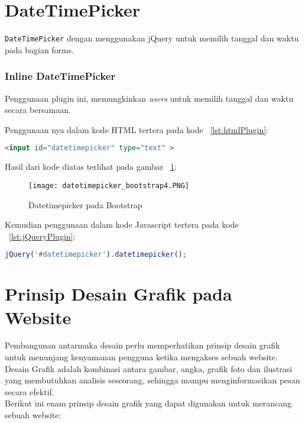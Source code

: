 \section{DateTimePicker}
\texttt{DateTimePicker} dengan menggunakan jQuery untuk memilih tanggal dan waktu pada bagian forms. \cite{datetimepicker}
\subsubsection{Inline DateTimePicker}
Penggunaan plugin ini, memungkinkan \textit{users} untuk memilih tanggal dan waktu secara bersamaan.

Penggunaan nya dalam kode HTML tertera pada kode ~\ref{lst:htmlPlugin}:
\begin{lstlisting}[style=customhtml, language=HTML,  basicstyle=\ttfamily, frame=single, columns=fullflexible, keepspaces=true, breaklines=true, showstringspaces=false, label={lst:htmlPlugin}, caption=Kode HTML pada plugin.] 
<input id="datetimepicker" type="text" >
\end{lstlisting}

\noindent Hasil dari kode diatas terlihat pada gambar ~\ref{fig:datetimepickerBootstrap}:
\begin{figure} [H]
	\centering  
	\texttt{[image: datetimepicker\_bootstrap4.PNG]}  
	\caption{Datetimepicker pada Bootstrap} 
	\label{fig:datetimepickerBootstrap}
\end{figure}

Kemudian penggunaan dalam kode Javascript tertera pada kode ~\ref{lst:jQueryPlugin}:

\begin{lstlisting}[style=JavaScript, language=JavaScript,  basicstyle=\ttfamily, frame=single, columns=fullflexible, keepspaces=true, breaklines=true, showstringspaces=false, label={lst:jQueryPlugin}, caption=Kode Inline DateTimePicker di jQuery.] 
jQuery('#datetimepicker').datetimepicker();
\end{lstlisting}

\section{Prinsip Desain Grafik pada Website}
Pembangunan antarmuka desain perlu memperhatikan prinsip desain grafik untuk menunjang kenyamanan pengguna ketika mengakses sebuah website. Desain Grafik adalah kombinasi antara gambar, angka, grafik foto dan ilustrasi yang membutuhkan analisis seseorang, sehingga mampu menginformasikan pesan secara efektif. \cite{graphicdesign}  \\
\noindent Berikut ini enam prinsip desain grafik yang dapat digunakan untuk merancang sebuah website:

